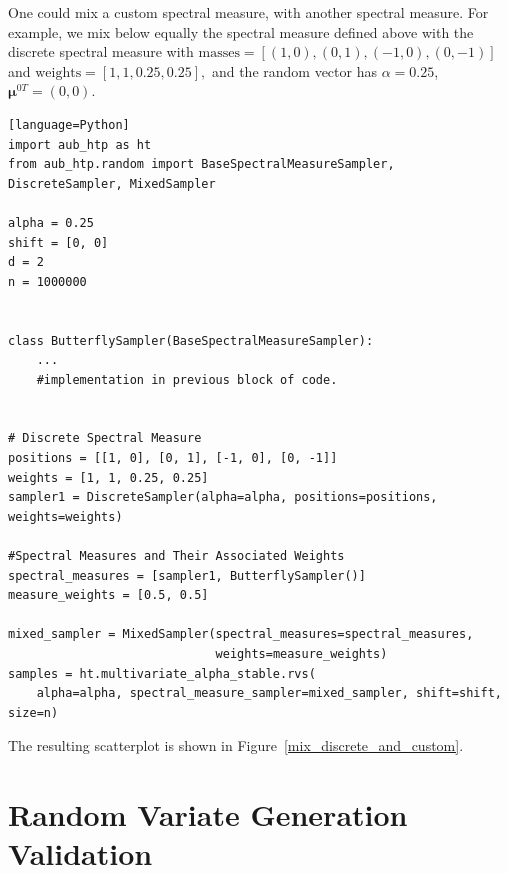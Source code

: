 
One could mix a custom spectral measure, with another spectral measure. For example, we mix below equally the spectral measure defined above with the discrete spectral measure with $\text{masses}=[(1,0),(0,1),(-1,0),(0,-1)]$ and $ \text{weights}=[1,1,0.25,0.25],$ and the random vector has $\alpha=0.25$, $\boldsymbol{\mu}^{0 T}=(0,0)$.

\begin{verbatim}[language=Python]
import aub_htp as ht
from aub_htp.random import BaseSpectralMeasureSampler, DiscreteSampler, MixedSampler

alpha = 0.25
shift = [0, 0]
d = 2
n = 1000000


class ButterflySampler(BaseSpectralMeasureSampler):
    ...
    #implementation in previous block of code.


# Discrete Spectral Measure
positions = [[1, 0], [0, 1], [-1, 0], [0, -1]]
weights = [1, 1, 0.25, 0.25]
sampler1 = DiscreteSampler(alpha=alpha, positions=positions, weights=weights)

#Spectral Measures and Their Associated Weights
spectral_measures = [sampler1, ButterflySampler()]
measure_weights = [0.5, 0.5]

mixed_sampler = MixedSampler(spectral_measures=spectral_measures,
                             weights=measure_weights)
samples = ht.multivariate_alpha_stable.rvs(
    alpha=alpha, spectral_measure_sampler=mixed_sampler, shift=shift, size=n)

\end{verbatim}

The resulting scatterplot is shown in Figure~\ref{mix_discrete_and_custom}.

\section{Random Variate Generation Validation}

